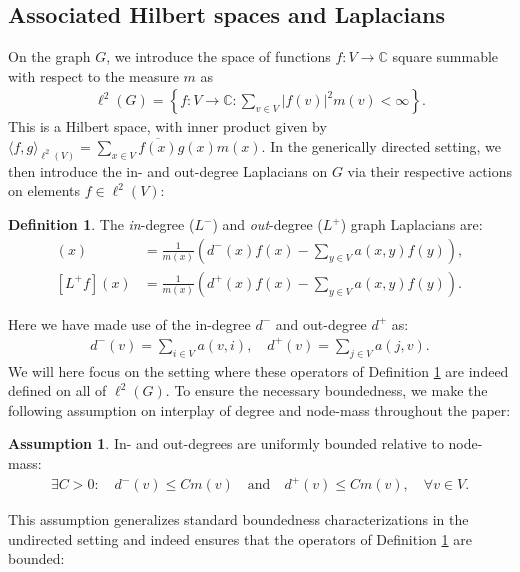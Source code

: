 \documentclass[reqno,12pt,letterpaper]{amsart}
\numberwithin{equation}{section}
\newcommand{\din}{d^{-}}
\newcommand{\dout}{d^{+}}
\newcommand{\Lin}{L^{-}}
\newcommand{\Lout}{L^{+}}
\newcommand{\1}{\mathds{1}}
\theoremstyle{definition}
\newtheorem{Def}[Th]{Definition}
\newtheorem{Ass}[Th]{Assumption}
\begin{document}
\subsection{Associated Hilbert spaces and Laplacians }
On the graph $G$,  we introduce the space of functions $f: V \rightarrow \mathds{C}$ square summable with respect to the measure $m$ as
\begin{align}
	\ell^2(G) = \left\{ f: V \rightarrow \mathds{C}: \sum\limits_{v \in V}  |f(v)|^2 m(v) < \infty      \right\}.
\end{align}
This is a Hilbert space, with inner product given by
$
	\langle f,g\rangle_{\ell^2(V)} = \sum_{x \in V} \overline{f(x)} g(x) m(x)
	$.
In the generically directed setting, we then introduce the in- and out-degree Laplacians on $G$ via their respective actions on elements $f \in \ell^2(V)$:

\begin{Def}\label{laplacian_definition}
	The \emph{in}-degree ($\Lin$) and \emph{out}-degree ($\Lout$) graph Laplacians are:
	\begin{align}
		[\Lin f](x) &= \frac{1}{m(x)} \left(\din(x)  f(x)   - \sum\limits_{y \in V} a(x,y) f(y) \right),\\
		[\Lout f](x) &= \frac{1}{m(x)} \left(\dout(x)  f(x)   - \sum\limits_{y \in V} a(x,y) f(y) \right).
	\end{align}
\end{Def}
Here we have made use of the in-degree $d^-$ and out-degree $d^+$ as:
\begin{align}
	\din(v) = \sum\limits_{i \in V} a(v,i) , \quad 	\dout(v) = \sum\limits_{j \in V} a(j,v).
\end{align} 
We will here focus on the setting where these operators of Definition \ref{laplacian_definition} are indeed defined on all of $\ell^2(G)$.
To ensure the necessary boundedness, we make the following assumption on interplay of degree and node-mass throughout the paper:
\begin{Ass}\label{well_behavedness_assumption}
	In- and out-degrees are uniformly bounded relative to node-mass:
		\begin{align}
			\exists C > 0 :  \quad	\din(v)	\leq C m(v) \quad \text{and} \quad \dout(v) \leq C m(v), \quad \forall v \in V .
		\end{align} 
\end{Ass}


This assumption generalizes standard boundedness characterizations in the undirected setting \cite{KostenkoNicolussi2023} and indeed ensures that the operators of Definition \ref{laplacian_definition} are bounded:
\end{document}
